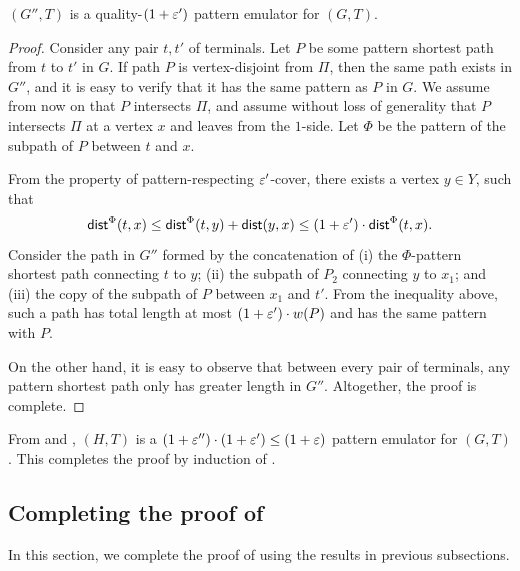 \begin{claim}
	\label{clm: cut glue}
	$(G'',T)$ is a quality-$(1+{\varepsilon}')$ pattern emulator for $(G,T)$.
\end{claim}
\begin{proof}
Consider any pair $t,t'$ of terminals. 
Let $P$ be some pattern shortest path from $t$ to $t'$ in $G$. If path $P$ is vertex-disjoint from $\Pi$, then the same path exists in $G''$, and it is easy to verify that it has the same pattern as $P$ in $G$. We assume from now on that $P$ intersects $\Pi$, and assume without loss of generality that $P$ intersects $\Pi$ at a vertex $x$ and leaves from the $1$-side.
Let $\Phi$ be the pattern of the subpath of $P$ between $t$ and $x$.
	
From the property of pattern-respecting ${\varepsilon}'$-cover, there exists a vertex $y\in Y$, such that 
$$\textnormal{\textsf{dist}}^{\Phi}(t,x)\le \textnormal{\textsf{dist}}^{\Phi}(t,y)+\textnormal{\textsf{dist}}(y,x)\le (1+{\varepsilon}')\cdot \textnormal{\textsf{dist}}^{\Phi}(t,x).$$ 
Consider the path in $G''$ formed by the concatenation of (i) the $\Phi$-pattern shortest path connecting $t$ to $y$; (ii) the subpath of $P_2$ connecting $y$ to $x_1$; and (iii) the copy of the subpath of $P$ between $x_1$ and $t'$.
From the inequality above, such a path has total length at most $(1+{\varepsilon}')\cdot w(P)$ and has the same pattern with $P$.

On the other hand, it is easy to observe that between every pair of terminals, any pattern shortest path only has greater length in $G''$. Altogether, the proof is complete.	
\end{proof}



From  and , $(H,T)$ is a $(1+{\varepsilon}'')\cdot (1+{\varepsilon}')\le (1+{\varepsilon})$ pattern emulator for $(G,T)$. This completes the proof by induction of .




\subsection{Completing the proof of }

In this section, we complete the proof of  using the results in previous subsections.

